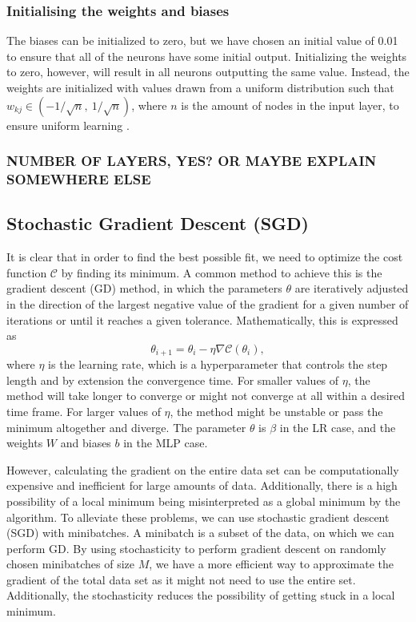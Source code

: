 \documentclass[a4paper, 11pt, twocolumn]{article}
\begin{document}
\subsubsection{Initialising  the weights and biases}	
The biases can be initialized to zero, but we have chosen an initial value of 0.01 
to ensure that all of the neurons have some initial output. Initializing the 
weights to zero, however, will result in all neurons outputting the same value. 
Instead, the  weights are initialized with values drawn from a uniform distribution 
such that $w_{kj}\in (-1/\sqrt{n}, \ 1/\sqrt{n})$, where $n$ is the amount of 
nodes in the input layer,  to ensure uniform learning \cite{ML_algo}.

\subsubsection{NUMBER OF LAYERS, YES? OR MAYBE EXPLAIN SOMEWHERE ELSE}
\subsection{Stochastic Gradient Descent (SGD)}
It is clear that in order to find the best possible fit, we need to optimize the 
cost function $\mathcal{C}$ by finding its minimum. A common method to achieve 
this is the gradient descent (GD) method, in which the parameters $\theta$ are iteratively adjusted in the direction of the largest negative value of the 
gradient for a given number of iterations or until it reaches a given tolerance. 
Mathematically, this is expressed as
\begin{equation}
\theta_{i+1} = \theta_i -\eta \nabla \mathcal{C}(\theta_i),
\end{equation}
where $\eta$ is the learning rate, which is a hyperparameter that controls the 
step length and by extension the convergence time. For smaller values of $\eta$, 
the method will take longer to converge or might not converge at all within a 
desired time frame. For larger values of $\eta$, the method might be unstable or 
pass the minimum altogether and diverge. The parameter $\theta$ is $\beta$ in 
the LR case, and the weights $W$ and biases $b$ in the MLP case.

However, calculating the gradient on the entire data set can be computationally 
expensive and inefficient for large amounts of data. Additionally, there is a high 
possibility of a local minimum being misinterpreted as a global minimum by the 
algorithm. To alleviate these problems, we can use stochastic gradient descent 
(SGD) with minibatches.  A minibatch is a subset of the data, on which we can 
perform GD. By using stochasticity to perform gradient descent on randomly chosen 
minibatches of size $M$, we have a more efficient way to approximate the gradient 
of the total data set as it might not need to use the entire set. Additionally, 
the stochasticity reduces the possibility of getting stuck in a local minimum.
\end{document}
